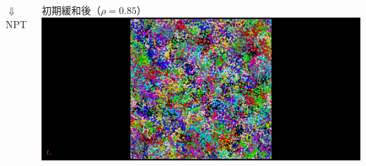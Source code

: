 \documentclass[11pt, dvipdfmx]{beamer}
\begin{document}
\begin{frame}
\begin{columns}[T, totalwidth=1\linewidth]
\begin{center}
$\Downarrow$ NPT
\end{center}
\vspace{-3mm}
初期緩和後（$\rho =0.85$）
\includegraphics[width=\columnwidth]{./fig/after.png}
\end{columns}
\end{frame}
\end{document}

